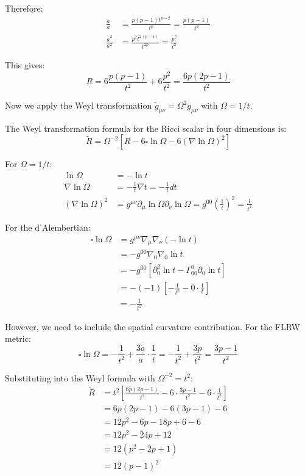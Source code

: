 Therefore:
\begin{align}
\frac{\ddot{a}}{a} &= \frac{p(p-1) t^{p-2}}{t^p} = \frac{p(p-1)}{t^2} \\
\frac{\dot{a}^2}{a^2} &= \frac{p^2 t^{2(p-1)}}{t^{2p}} = \frac{p^2}{t^2}
\end{align}

This gives:
\begin{equation}
R = 6 \frac{p(p-1)}{t^2} + 6 \frac{p^2}{t^2} = \frac{6p(2p-1)}{t^2}
\end{equation}

Now we apply the Weyl transformation $\tilde{g}_{\mu\nu} = \Omega^2 g_{\mu\nu}$ with $\Omega = 1/t$.

The Weyl transformation formula for the Ricci scalar in four dimensions is:
\begin{equation}
\tilde{R} = \Omega^{-2} \left[ R - 6 \square \ln \Omega - 6 (\nabla \ln \Omega)^2 \right]
\end{equation}

For $\Omega = 1/t$:
\begin{align}
\ln \Omega &= -\ln t \\
\nabla \ln \Omega &= -\frac{1}{t} \nabla t = -\frac{1}{t} dt \\
(\nabla \ln \Omega)^2 &= g^{\mu\nu} \partial_\mu \ln \Omega \partial_\nu \ln \Omega = g^{00} \left(\frac{1}{t}\right)^2 = \frac{1}{t^2}
\end{align}

For the d'Alembertian:
\begin{align}
\square \ln \Omega &= g^{\mu\nu} \nabla_\mu \nabla_\nu (-\ln t) \\
&= -g^{00} \nabla_0 \nabla_0 \ln t \\
&= -g^{00} \left[ \partial_0^2 \ln t - \Gamma^0_{00} \partial_0 \ln t \right] \\
&= -(-1) \left[ -\frac{1}{t^2} - 0 \cdot \frac{1}{t} \right] \\
&= -\frac{1}{t^2}
\end{align}

However, we need to include the spatial curvature contribution. For the FLRW metric:
\begin{equation}
\square \ln \Omega = -\frac{1}{t^2} + \frac{3\dot{a}}{a} \cdot \frac{1}{t} = -\frac{1}{t^2} + \frac{3p}{t^2} = \frac{3p-1}{t^2}
\end{equation}

Substituting into the Weyl formula with $\Omega^{-2} = t^2$:
\begin{align}
\tilde{R} &= t^2 \left[ \frac{6p(2p-1)}{t^2} - 6 \cdot \frac{3p-1}{t^2} - 6 \cdot \frac{1}{t^2} \right] \\
&= 6p(2p-1) - 6(3p-1) - 6 \\
&= 12p^2 - 6p - 18p + 6 - 6 \\
&= 12p^2 - 24p + 12 \\
&= 12(p^2 - 2p + 1) \\
&= 12(p-1)^2
\end{align}

